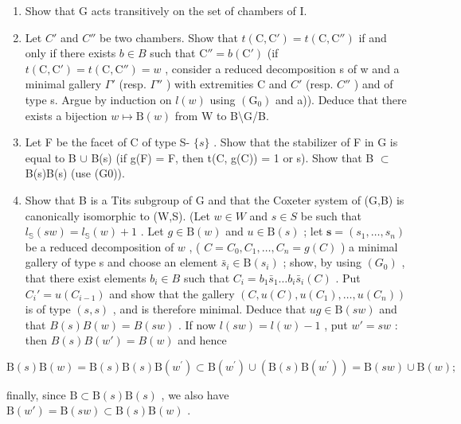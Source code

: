 \begin{enumerate}
\def\labelenumi{\alph{enumi})}
\item
  Show that G acts transitively on the set of chambers of I.
\item
  Let \(C'\) and \(C''\) be two chambers. Show that \(t(\mathrm{C},\mathrm{C}') = t(\mathrm{C},\mathrm{C}'')\) if and only if there exists \(b \in B\) such that \(\mathrm{C}'' = b(\mathrm{C}')\) (if \(t(\mathrm{C},\mathrm{C}') = t(\mathrm{C},\mathrm{C}'') = w\) , consider a reduced decomposition s of w and a minimal gallery \(\Gamma'\) (resp. \(\Gamma''\) ) with extremities C and \(C'\) (resp. \(C''\) ) and of type s. Argue by induction on \(l(w)\) using \((\mathrm{G}_{0})\) and a)). Deduce that there exists a bijection \(w \mapsto \mathrm{B}(w)\) from W to B\textbackslash G/B.
\item
  Let F be the facet of C of type S- \(\{s\}\) . Show that the stabilizer of F in G is equal to B \(\cup\) B(s) (if g(F) = F, then t(C, g(C)) = 1 or s). Show that B \(\subset\) B(s)B(s) (use (G0)).
\item
  Show that B is a Tits subgroup of G and that the Coxeter system of (G,B) is canonically isomorphic to (W,S). (Let \(w \in W\) and \(s \in S\) be such that \(l_{\mathbb{S}}(sw) = l_{\mathbb{S}}(w) + 1\) . Let \(g \in \mathrm{B}(w)\) and \(u \in \mathrm{B}(s)\) ; let \(\mathbf{s} = (s_1, \ldots, s_n)\) be a reduced decomposition of \(w\) , ( \(C = C_0, C_1, \ldots, C_n = g(C)\) ) a minimal gallery of type s and choose an element \(\bar{s}_i \in \mathrm{B}(s_i)\) ; show, by using \((G_0)\) , that there exist elements \(b_i \in B\) such that \(C_i = b_1 \bar{s}_1 \ldots b_i \bar{s}_i(C)\) . Put \(C_i' = u(C_{i-1})\) and show that the gallery \((C, u(C), u(C_1), \ldots, u(C_n))\) is of type \((s, s)\) , and is therefore minimal. Deduce that \(ug \in \mathrm{B}(sw)\) and that \(B(s) B(w) = B(sw)\) . If now \(l(sw) = l(w) - 1\) , put \(w' = sw\) : then \(B(s) B(w') = B(w)\) and hence
\end{enumerate}

\[
\mathrm{B} (s) \mathrm{B} (w) = \mathrm{B} (s) \mathrm{B} (s) \mathrm{B} \left(w ^ {\prime}\right) \subset \mathrm{B} \left(w ^ {\prime}\right) \cup \left(\mathrm{B} (s) \mathrm{B} \left(w ^ {\prime}\right)\right) = \mathrm{B} (s w) \cup \mathrm{B} (w);
\]

finally, since \(\mathrm{B} \subset \mathrm{B}(s)\mathrm{B}(s)\) , we also have \(\mathrm{B}(w') = \mathrm{B}(sw) \subset \mathrm{B}(s)\mathrm{B}(w)\) .

